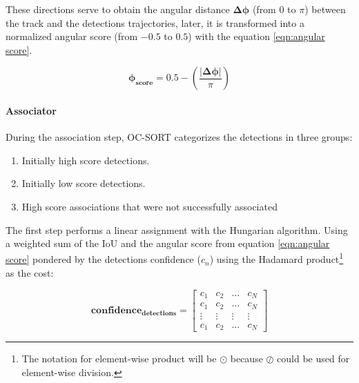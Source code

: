 {
    These directions serve to obtain the angular distance $\mathbf{\Delta\phi}$ (from 0 to $\pi$) between the track and the detections trajectories, 
    later, it is transformed into a normalized angular score (from $-0.5$ to $0.5$) with the equation \ref{eqn:angular score}.
}


\begin{equation}
    \label{eqn:angular score}
    \mathbf{\phi_{score}} = 0.5 - \left(\frac{|\mathbf{\Delta\phi}|}{\pi}\right)
\end{equation}

\needspace{0.1\textheight}

\paragraph{Associator}

{
    During the association step, \ac{OC-SORT} categorizes the detections in three groups:
}

\begin{enumerate}
    \item Initially high score detections.
    \item Initially low score detections.
    \item High score associations that were not successfully associated
\end{enumerate}

{
    The first step performs a linear assignment with the Hungarian algorithm. 
    Using a weighted sum of the \ac{IoU} and the angular score from equation \ref{eqn:angular score} 
    pondered by the detections confidence ($c_{n}$) using the Hadamard product\footnote{The notation for element-wise product will be $\odot$ because $\oslash$ could be used for element-wise division.} as the cost:
}

\begin{equation}
    \label{eqn:detection confidence matrix}
    \mathbf{confidence_{detections}} = \begin{bmatrix}
        c_{1} & c_{2} & \hdots & c_{N} \\
        c_{1} & c_{2} & \hdots & c_{N} \\
        \vdots & \vdots & \vdots & \vdots \\ 
        c_{1} & c_{2} & \hdots & c_{N}
    \end{bmatrix}
\end{equation}

